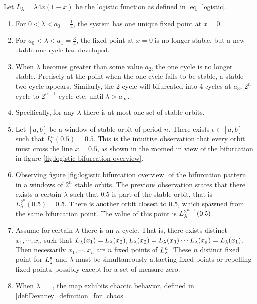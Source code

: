\begin{observation}\label{th:logistic_bifurcation}
	Let $L_{\lambda} = \lambda 4x(1-x) $ be the logistic function as defined in \ref{eq_logistic}.

	\begin{enumerate}
		\item For $0 < \lambda < a_0 = \frac{1}{4}$, the system has one unique fixed point at $x = 0$. \label{log_fix_0}

		\item For $a_0 <\lambda < a_1 = \frac{3}{4}$, the fixed point at $x=0$ is no longer stable, but a new stable one-cycle has developed. \label{log_fix_1}

		\item When $\lambda$ becomes greater than some value $a_2$, the one cycle is no longer stable. 
		Precisely at the point when the one cycle fails to be stable, a stable two cycle appears. 
		Similarly, the 2 cycle will bifurcated into 4 cycles at $a_3$, $2^n$ cycle to $2^{n+1}$ cycle etc, until $\lambda > a_{\infty}$. 
		\label{log_periodic_doubling}
		\item Specifically, for any $\lambda$ there is at most one set of stable orbits. \label{log_at_most_one_stable_orbit}

		\item \label{log_cross_half} 
		Let $[a, b]$ be a window of stable orbit of period $n$.
		There exists $\epsilon \in [a, b]$ such that $L_{\epsilon}^n(0.5) = 0.5$. 
		This is the intuitive observation that every orbit must cross the line $x = 0.5$, as shown in the zoomed in view of the bifurcation in figure \ref{fig:logistic bifurcation overview}.
		\item \label{log_closest_branch}
		Observing figure \ref{fig:logistic bifurcation overview} of the bifurcation pattern in a windows of $2^n$ stable orbits. 
		The previous observation states that there exists a certain $\lambda$ such that $0.5$ is part of the stable orbit, that is $L_{\lambda}^{2^n}(0.5) = 0.5$.
		There is another orbit closest to $0.5$, which spawned from the same bifurcation point.
		The value of this point is $L_{\lambda}^{2^{n-1}}(0.5)$.

	\item \label{log_simul_stable_or_unstable}
		Assume for certain $\lambda$ there is an $n$ cycle. That is, there exists distinct $x_1, \cdots, x_n$ such that $L_{\lambda}(x_1) = L_{\lambda}(x_2), L_{\lambda}(x_2) = L_{\lambda}(x_3) \cdots L_{\lambda}(x_n) = L_{\lambda}(x_1)$.
		Then necessarily $x_1, \cdots, x_n$ are $n$ fixed points of $L_{\lambda}^n$. 
		These $n$ distinct fixed point for $L_{\lambda}^n$ and $\lambda$ must be simultaneously attacting fixed points or repelling fixed points, possibly except for a set of measure zero.

		\item  \label{log_chaos_at_1}
			When $\lambda = 1$, the map exhibits chaotic behavior, defined in \ref{def:Devaney_definition_for_chaos}. 
	\end{enumerate}
\end{observation}

